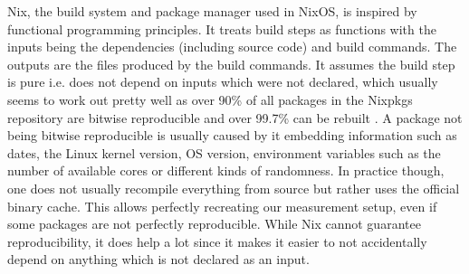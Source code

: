 Nix, the build system and package manager used in NixOS, is inspired by functional programming principles.
It treats build steps as functions with the inputs being the dependencies (including source code) and build commands.
The outputs are the files produced by the build commands.
It assumes the build step is pure i.e. does not depend on inputs which were not declared, which usually seems to work out pretty well as over 90\% of all packages in the Nixpkgs repository are bitwise reproducible and over 99.7\% can be rebuilt \cite{malka:hal-04913007}.
A package not being bitwise reproducible is usually caused by it embedding information such as dates, the Linux kernel version, OS version, environment variables such as the number of available cores or different kinds of randomness.
In practice though, one does not usually recompile everything from source but rather uses the official binary cache.
This allows perfectly recreating our measurement setup, even if some packages are not perfectly reproducible.
While Nix cannot guarantee reproducibility, it does help a lot since it makes it easier to not accidentally depend on anything which is not declared as an input.

